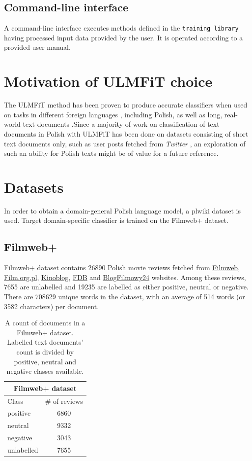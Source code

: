 \subsection{Command-line interface}

A command-line interface executes methods defined in the \lstinline{training library} having processed input data provided by the user. It is operated according to a provided user manual.

\section{Motivation of ULMFiT choice}

The ULMFiT method has been proven to produce accurate classifiers when used on tasks in different foreign languages \cite{thomas:codefirstnlp}, including Polish, as well as long, real-world text documents \cite{ulmfit}.Since a majority of work on classification of text documents in Polish with ULMFiT has been done on datasets consisting of short text documents only, such as user posts fetched from \emph{Twitter} \cite{czaplakardas:ulmfit, korzeniowski:poleval}, an exploration of such an ability for Polish texts might be of value for a future reference.

\section{Datasets}
\label{datasets}

In order to obtain a domain-general Polish language model, a plwiki dataset is used. Target domain-specific classifier is trained on the Filmweb+ dataset.

\subsection{Filmweb+}
\label{filmwebplus}

Filmweb+ dataset contains 26890 Polish movie reviews fetched from \href{https://www.filmweb.pl/}{Filmweb}, \href{https://film.org.pl/}{Film.org.pl}, \href{https://kinoblog.video.blog/}{Kinoblog}, \href{https://fdb.pl/}{FDB} and \href{http://blogfilmowy24.blogspot.com/}{BlogFilmowy24} websites. Among these reviews, 7655 are unlabelled and 19235 are labelled as either positive, neutral or negative. There are 708629 unique words in the dataset, with an average of 514 words (or 3582 characters) per document.

\begin{table}[ht]
\centering
\begin{tabular}{ lc }
\toprule
\multicolumn{2}{c}{Filmweb+ dataset} \\ \midrule
Class & $\#$ of reviews \\ \midrule
positive & 6860 \\
neutral & 9332\\
negative & 3043 \\ \midrule
unlabelled & 7655 \\
\bottomrule
\end{tabular}
\caption{A count of documents in a Filmweb+ dataset. Labelled text documents' count is divided by positive, neutral and negative classes available.}
\end{table}

